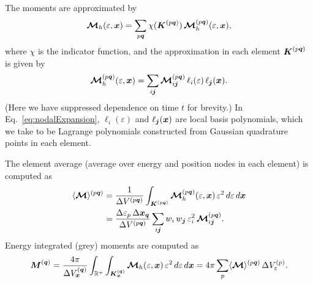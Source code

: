 \documentclass[10pt]{article}
\begin{document}
The moments are approximated by
\begin{equation}
  \boldsymbol{\mathcal{M}}_{h}(\varepsilon,\boldsymbol{x})=\sum_{p\boldsymbol{q}}\chi(\boldsymbol{K}^{(p\boldsymbol{q})})\,\boldsymbol{\mathcal{M}}_{h}^{(p\boldsymbol{q})}(\varepsilon,\boldsymbol{x}),
\end{equation}
where $\chi$ is the indicator function, and the approximation in each element $\boldsymbol{K}^{(p\boldsymbol{q})}$ is given by
\begin{equation}
  \boldsymbol{\mathcal{M}}_{h}^{(p\boldsymbol{q})}(\varepsilon,\boldsymbol{x}) = \sum_{i\boldsymbol{j}}\boldsymbol{\mathcal{M}}_{i\boldsymbol{j}}^{(p\boldsymbol{q})}\,\ell_{i}(\varepsilon)\,\ell_{\boldsymbol{j}}(\boldsymbol{x}).  
  \label{eq:nodalExpansion}
\end{equation}
(Here we have suppressed dependence on time $t$ for brevity.)
In Eq.~\eqref{eq:nodalExpansion}, $\ell_{i}(\varepsilon)$ and $\ell_{\boldsymbol{j}}(\boldsymbol{x})$ are local basis polynomials, which we take to be Lagrange polynomials constructed from Gaussian quadrature points in each element.  

The element average (average over energy and position nodes in each element) is computed as
\begin{align}
  \langle\boldsymbol{\mathcal{M}}\rangle^{(p\boldsymbol{q})}
  &=\frac{1}{\Delta V^{(p\boldsymbol{q})}}\int_{\boldsymbol{K}^{(p\boldsymbol{q})}}\boldsymbol{\mathcal{M}}_{h}^{(p\boldsymbol{q})}(\varepsilon,\boldsymbol{x})\,\varepsilon^{2}\,d\varepsilon\,d\boldsymbol{x} \nonumber \\
  &=\frac{\Delta\varepsilon_{p}\,\Delta\boldsymbol{x}_{\boldsymbol{q}}}{\Delta V^{(p\boldsymbol{q})}}\sum_{i\boldsymbol{j}}w_{i}\,w_{\boldsymbol{j}}\,\varepsilon_{i}^{2}\,\boldsymbol{\mathcal{M}}_{i\boldsymbol{j}}^{(p\boldsymbol{q})}.  
\end{align}
Energy integrated (grey) moments are computed as
\begin{equation}
  \boldsymbol{M}^{(\boldsymbol{q})}
  =\frac{4\pi}{\Delta V_{\boldsymbol{x}}^{(\boldsymbol{q})}}\int_{\mathbb{R}^{+}}\int_{\boldsymbol{K}_{\boldsymbol{x}}^{(\boldsymbol{q})}}\boldsymbol{\mathcal{M}}_{h}(\varepsilon,\boldsymbol{x})\,\varepsilon^{2}\,d\varepsilon\,d\boldsymbol{x}
  =4\pi\sum_{p}\langle\boldsymbol{\mathcal{M}}\rangle^{(p\boldsymbol{q})}\,\Delta V_{\varepsilon}^{(p)}.  
\end{equation}
\end{document}
